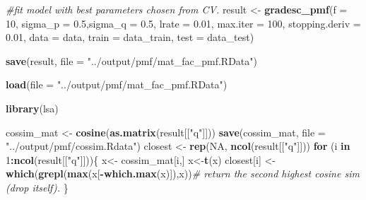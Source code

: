 \documentclass[]{article}
\newenvironment{Shaded}{\begin{snugshade}}{\end{snugshade}}
\newcommand{\CommentTok}[1]{\textcolor[rgb]{0.56,0.35,0.01}{\textit{#1}}}
\newcommand{\ControlFlowTok}[1]{\textcolor[rgb]{0.13,0.29,0.53}{\textbf{#1}}}
\newcommand{\DataTypeTok}[1]{\textcolor[rgb]{0.13,0.29,0.53}{#1}}
\newcommand{\DecValTok}[1]{\textcolor[rgb]{0.00,0.00,0.81}{#1}}
\newcommand{\FloatTok}[1]{\textcolor[rgb]{0.00,0.00,0.81}{#1}}
\newcommand{\KeywordTok}[1]{\textcolor[rgb]{0.13,0.29,0.53}{\textbf{#1}}}
\newcommand{\NormalTok}[1]{#1}
\newcommand{\OperatorTok}[1]{\textcolor[rgb]{0.81,0.36,0.00}{\textbf{#1}}}
\newcommand{\OtherTok}[1]{\textcolor[rgb]{0.56,0.35,0.01}{#1}}
\newcommand{\StringTok}[1]{\textcolor[rgb]{0.31,0.60,0.02}{#1}}
\begin{document}
\begin{Shaded}
\begin{Highlighting}[]
\CommentTok{#fit model with best parameters chosen from CV.}
\NormalTok{result <-}\StringTok{ }\KeywordTok{gradesc_pmf}\NormalTok{(}\DataTypeTok{f =} \DecValTok{10}\NormalTok{, }\DataTypeTok{sigma_p =} \FloatTok{0.5}\NormalTok{,}\DataTypeTok{sigma_q =} \FloatTok{0.5}\NormalTok{, }\DataTypeTok{lrate =} \FloatTok{0.01}\NormalTok{, }\DataTypeTok{max.iter =} \DecValTok{100}\NormalTok{, }\DataTypeTok{stopping.deriv =} \FloatTok{0.01}\NormalTok{, }\DataTypeTok{data =}\NormalTok{ data, }\DataTypeTok{train =}\NormalTok{ data_train, }\DataTypeTok{test =}\NormalTok{ data_test)}

\KeywordTok{save}\NormalTok{(result, }\DataTypeTok{file =} \StringTok{"../output/pmf/mat_fac_pmf.RData"}\NormalTok{)}
\end{Highlighting}
\end{Shaded}

\begin{Shaded}
\begin{Highlighting}[]
\KeywordTok{load}\NormalTok{(}\DataTypeTok{file =} \StringTok{"../output/pmf/mat_fac_pmf.RData"}\NormalTok{)}

\KeywordTok{library}\NormalTok{(lsa)}

\NormalTok{cossim_mat <-}\StringTok{ }\KeywordTok{cosine}\NormalTok{(}\KeywordTok{as.matrix}\NormalTok{(result[[}\StringTok{"q"}\NormalTok{]]))}
\KeywordTok{save}\NormalTok{(cossim_mat, }\DataTypeTok{file =} \StringTok{"../output/pmf/cossim.Rdata"}\NormalTok{)}
\NormalTok{closest <-}\StringTok{ }\KeywordTok{rep}\NormalTok{(}\OtherTok{NA}\NormalTok{, }\KeywordTok{ncol}\NormalTok{(result[[}\StringTok{"q"}\NormalTok{]]))}
\ControlFlowTok{for}\NormalTok{ (i }\ControlFlowTok{in} \DecValTok{1}\OperatorTok{:}\KeywordTok{ncol}\NormalTok{(result[[}\StringTok{"q"}\NormalTok{]]))\{}
\NormalTok{  x<-}\StringTok{ }\NormalTok{cossim_mat[i,]}
\NormalTok{  x<-}\KeywordTok{t}\NormalTok{(x)}
\NormalTok{  closest[i] <-}\StringTok{ }\KeywordTok{which}\NormalTok{(}\KeywordTok{grepl}\NormalTok{(}\KeywordTok{max}\NormalTok{(x[}\OperatorTok{-}\KeywordTok{which.max}\NormalTok{(x)]),x))}\CommentTok{# return the second highest cosine sim (drop itself).}
\NormalTok{\}}
\end{Highlighting}
\end{Shaded}

\begin{Shaded}
\end{Shaded}
\end{document}
